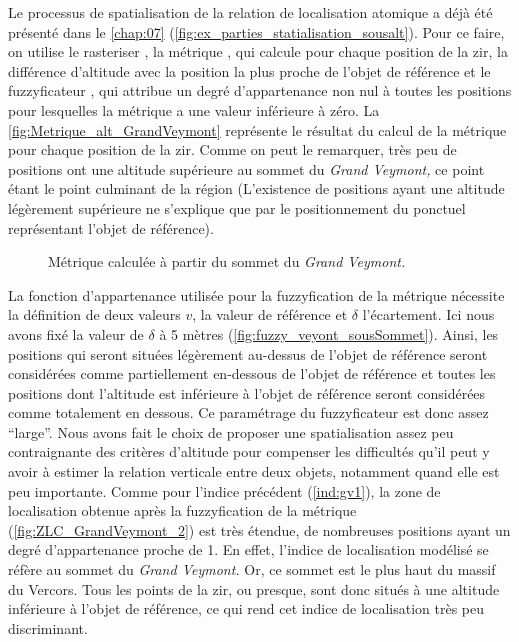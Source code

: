 Le processus de spatialisation de la relation de localisation atomique
 a déjà été présenté dans le
\autoref{chap:07}
(\autoref{fig:ex_parties_statialisation_sousalt}). Pour ce faire, on
utilise le rasteriser , la métrique
, qui calcule pour chaque position de
la \ac{zir}, la différence d'altitude avec la position la plus proche
de l'objet de référence et le fuzzyficateur ,
qui attribue un degré d'appartenance non nul à toutes les positions
pour lesquelles la métrique a une valeur inférieure à zéro. La
\autoref{fig:Metrique_alt_GrandVeymont} représente le résultat du
calcul de la métrique pour chaque position de la \ac{zir}. Comme on
peut le remarquer, très peu de positions ont une altitude supérieure
au sommet du \emph{Grand Veymont,} ce point étant le point culminant
de la région (L’existence de positions ayant une altitude légèrement
supérieure ne s'explique que par le positionnement du ponctuel
représentant l'objet de référence).

\begin{figure}
  \centering
  
  \caption{Métrique \protect{} calculée
    à partir du sommet du \emph{Grand Veymont.}}
  \label{fig:Metrique_alt_GrandVeymont}
\end{figure}

La fonction d'appartenance utilisée pour la fuzzyfication de la
métrique nécessite la définition de deux valeurs \(v\), la valeur de
référence et \(\delta\) l'écartement. Ici nous avons fixé la valeur de
\(\delta\) à 5 mètres (\autoref{fig:fuzzy_veyont_sousSommet}). Ainsi,
les positions qui seront situées légèrement au-dessus de l'objet de
référence seront considérées comme partiellement en-dessous de l'objet
de référence et toutes les positions dont l'altitude est inférieure à
l'objet de référence seront considérées comme totalement en
dessous. Ce paramétrage du fuzzyficateur  est
donc assez \enquote{large}. Nous avons fait le choix de proposer une
spatialisation assez peu contraignante des critères d'altitude pour
compenser les difficultés qu'il peut y avoir à estimer la relation
verticale entre deux objets, notamment quand elle est peu importante.
Comme pour l'indice précédent (\ref{ind:gv1}), la zone de localisation
obtenue après la fuzzyfication de la métrique
(\autoref{fig:ZLC_GrandVeymont_2}) est très étendue, de nombreuses
positions ayant un degré d'appartenance proche de 1. En effet,
l'indice de localisation modélisé se réfère au sommet du \emph{Grand
  Veymont.} Or, ce sommet est le plus haut du massif du Vercors. Tous
les points de la \ac{zir}, ou presque, sont donc situés à une altitude
inférieure à l'objet de référence, ce qui rend cet indice de
localisation très peu discriminant.

